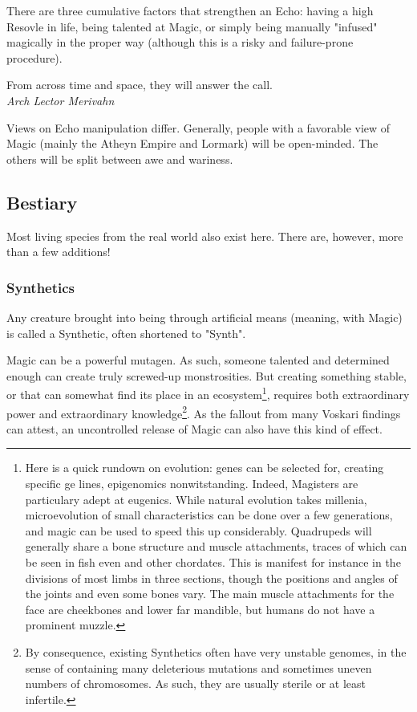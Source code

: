 There are three cumulative factors that strengthen an Echo: having a high Resovle in life, being talented at Magic, or simply being manually "infused" magically in the proper way (although this is a risky and failure-prone procedure).

\begin{rpg-quotebox}
    From across time and space, they will answer the call. \\ \textendash \textit{Arch Lector Merivahn}
\end{rpg-quotebox}
        
Views on Echo manipulation differ. Generally, people with a favorable view of Magic (mainly the Atheyn Empire and Lormark) will be open-minded. The others will be split between awe and wariness.




\subsection{Bestiary}

Most living species from the real world also exist here. There are, however, more than a few additions!



\subsubsection{Synthetics}

Any creature brought into being through artificial means (meaning, with Magic) is called a Synthetic, often shortened to "Synth".

Magic can be a powerful mutagen. As such, someone talented and determined enough can create truly screwed-up monstrosities. But creating something stable, or that can somewhat find its place in an ecosystem\footnote{Here is a quick rundown on evolution: genes can be selected for, creating specific ge lines, epigenomics nonwitstanding. Indeed, Magisters are particulary adept at eugenics. While natural evolution takes millenia, microevolution of small characteristics can be done over a few generations, and magic can be used to speed this up considerably. Quadrupeds will generally share a bone structure and muscle attachments, traces of which can be seen in fish even and other chordates. This is manifest for instance in the divisions of most limbs in three sections, though the positions and angles of the joints and even some bones vary. The main muscle attachments for the face are cheekbones and lower far mandible, but humans do not have a prominent muzzle.}, requires both extraordinary power and extraordinary knowledge\footnote{By consequence, existing Synthetics often have very unstable genomes, in the sense of containing many deleterious mutations and sometimes uneven numbers of chromosomes. As such, they are usually sterile or at least infertile.}. As the fallout from many Voskari findings can attest, an uncontrolled release of Magic can also have this kind of effect.

